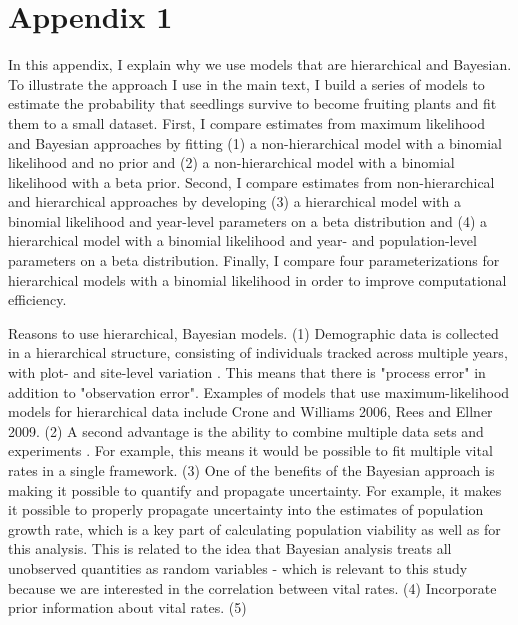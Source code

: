 \documentclass[12pt, oneside, titlepage]{article}   	%
\begin{document}
 

\section*{Appendix 1}


In this appendix, I explain why we use models that are hierarchical and Bayesian. To illustrate the approach I use in the main text, I build a series of models to estimate the probability that seedlings survive to become fruiting plants and fit them to a small dataset. First, I compare estimates from maximum likelihood and Bayesian approaches by fitting (1) a non-hierarchical model with a binomial likelihood and no prior and (2) a non-hierarchical model with a binomial likelihood with a beta prior. Second, I compare estimates from non-hierarchical and hierarchical approaches by developing (3) a hierarchical model with a binomial likelihood and year-level parameters on a beta distribution and (4) a hierarchical model with a binomial likelihood and year- and population-level parameters on a beta distribution. Finally, I compare four parameterizations for hierarchical models with a binomial likelihood in order to improve computational efficiency. 

Reasons to use hierarchical, Bayesian models. (1) Demographic data is collected in a hierarchical structure, consisting of individuals tracked across multiple years, with plot- and site-level variation \cite{elderd2016}. This means that there is "process error" in addition to "observation error". Examples of models that use maximum-likelihood models for hierarchical data include Crone and Williams 2006, Rees and Ellner 2009. (2) A second advantage is the ability to combine multiple data sets and experiments \cite{elderd2016}. For example, this means it would be possible to fit multiple vital rates in a single framework. (3) One of the benefits of the Bayesian approach is making it possible to quantify and propagate uncertainty. For example, it makes it possible to properly propagate uncertainty into the estimates of population growth rate, which is a key part of calculating population viability as well as for this analysis. This is related to the idea that Bayesian analysis treats all unobserved quantities as random variables - which is relevant to this study because we are interested in the correlation between vital rates. (4) Incorporate prior information about vital rates. (5) 
\end{document}
